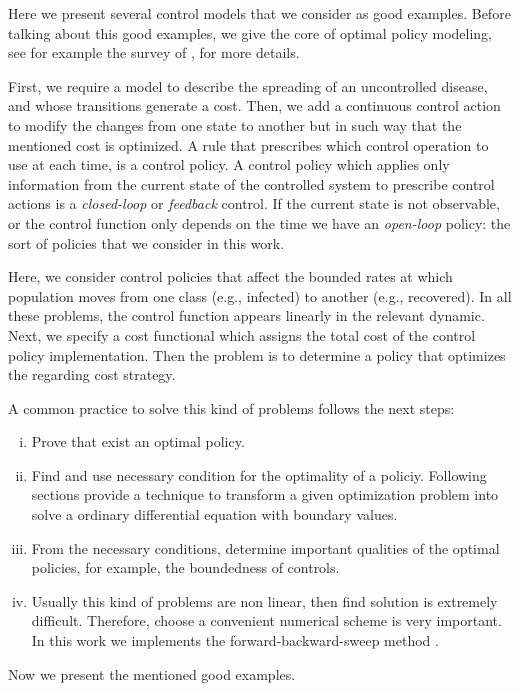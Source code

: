   Here we present  several control models that we consider as good 
examples. Before talking about this good examples, we give the core of optimal 
policy modeling, see for example the survey of \citet{Wickwire1977}, for more
details.

  First, we require a model to describe the spreading of an uncontrolled
disease, and whose transitions generate a cost. Then, we add a continuous
control action to modify the changes from one state to another but in such way
that the mentioned cost is optimized. A rule that prescribes which control
operation to use at each time, is a control policy. A control policy which
applies only information from the current state of the controlled system to
prescribe control actions is a \emph{closed-loop} or \emph{feedback} control.
If the current state is not observable, or the control function only depends 
on the time we have an \emph{open-loop} policy: the sort of policies that we 
consider in this work.

  Here, we consider control policies that affect the bounded rates at which
population moves from one class (e.g., infected) to another (e.g., recovered).
In all these problems, the control function appears linearly in the relevant
dynamic. Next, we specify a cost functional which assigns the total cost of the
control policy implementation. Then the problem is to determine a policy that
optimizes the regarding cost strategy.

  A common practice to solve this kind of problems follows the next steps:
  \begin{enumerate}[(i)]
    \item
      Prove that exist an optimal policy.
    \item 
      Find and use necessary condition for the optimality of a policiy.
      Following sections provide a technique to transform a given optimization
      problem into solve a ordinary differential equation with boundary values.
    \item 
      From the necessary conditions, determine important qualities of the 
      optimal policies, for example, the boundedness of controls.
    \item 
      Usually this kind of problems are non linear, then find solution is 
      extremely difficult. Therefore, choose a convenient numerical scheme is
      very important. In this work we implements the forward-backward-sweep 
      method \cite{lenhart2007optimal}.
  \end{enumerate}

  Now we present the mentioned good examples.
